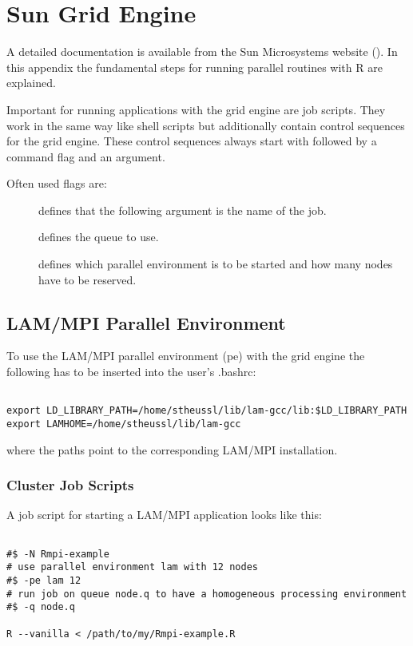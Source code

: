 
\section{Sun Grid Engine}
\label{app:gridengine}

A detailed documentation is available from the Sun Microsystems
website (\cite{sge07}). In this appendix the fundamental steps for
running parallel routines with R are explained.

Important for running applications with the grid engine are job
scripts. They work in the same way like shell scripts but additionally
contain control sequences for the grid engine. These control sequences
always start with \code{#$} %
followed by a command flag and an argument.

Often used flags are:
\begin{description}
\item[] defines that the following argument is the name of
  the job.  
\item[] defines the queue to use.
\item[] defines which parallel environment is to be started
  and how many nodes have to be reserved.
\end{description}

\subsection{LAM/MPI Parallel Environment}

To use the LAM/MPI parallel environment (pe) with the grid engine the
following has to be inserted into the user's .bashrc:

\begin{verbatim}

export LD_LIBRARY_PATH=/home/stheussl/lib/lam-gcc/lib:$LD_LIBRARY_PATH
export LAMHOME=/home/stheussl/lib/lam-gcc

\end{verbatim}

where the paths point to the corresponding LAM/MPI installation.

\subsubsection{Cluster Job Scripts}

A job script for starting a LAM/MPI application looks like this:

\begin{verbatim}

#$ -N Rmpi-example
# use parallel environment lam with 12 nodes
#$ -pe lam 12
# run job on queue node.q to have a homogeneous processing environment 
#$ -q node.q

R --vanilla < /path/to/my/Rmpi-example.R
\end{verbatim}

